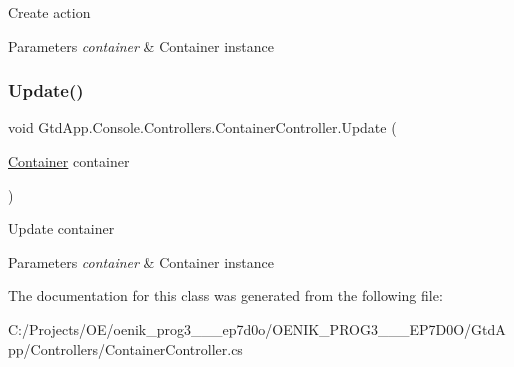 Create action 


\begin{DoxyParams}{Parameters}
{\em container} & Container instance\\
\hline
\end{DoxyParams}
\mbox{\label{class_gtd_app_1_1_console_1_1_controllers_1_1_container_controller_a3280a98b56c9f2fea9ef84ac2bccb41c}} 
\subsubsection{\texorpdfstring{Update()}{Update()}}
{\footnotesize\ttfamily void Gtd\+App.\+Console.\+Controllers.\+Container\+Controller.\+Update (\begin{DoxyParamCaption}\item[{\mbox{\hyperlink{class_gtd_app_1_1_data_1_1_container}{Container}}}]{container }\end{DoxyParamCaption})}



Update container 


\begin{DoxyParams}{Parameters}
{\em container} & Container instance\\
\hline
\end{DoxyParams}


The documentation for this class was generated from the following file\+:\begin{DoxyCompactItemize}
\item 
C\+:/\+Projects/\+O\+E/oenik\+\_\+prog3\+\_\+\_\+\_\+ep7d0o/\+O\+E\+N\+I\+K\+\_\+\+P\+R\+O\+G3\+\_\+\_\+\_\+\+E\+P7\+D0\+O/\+Gtd\+App/\+Controllers/Container\+Controller.\+cs\end{DoxyCompactItemize}
